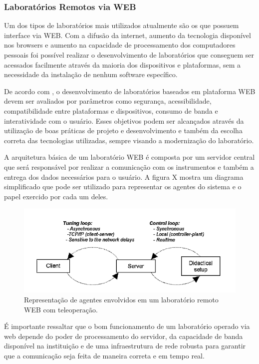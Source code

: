 \subsubsection{Laboratórios Remotos via WEB}
Um dos tipos de laboratórios mais utilizados atualmente são os que possuem interface via WEB. Com a difusão da internet, aumento da tecnologia disponível nos browsers e aumento na capacidade de processamento dos computadores pessoais foi possível realizar o desenvolvimento de laboratórios que conseguem ser acessados facilmente através da maioria dos dispositivos e plataformas, sem a necessidade da instalação de nenhum software específico. \cite{andria2006remote}
\par
De acordo com , o desenvolvimento de laboratórios baseados em plataforma WEB devem ser avaliados por parâmetros como segurança, acessibilidade, compatibilidade entre plataformas e dispositivos, consumo de banda e interatividade com o usuário. Esses objetivos podem ser alcançados através da utilização de boas práticas de projeto e desenvolvimento e também da escolha correta das tecnologias utilizadas, sempre visando a modernização do laboratório.
\par
A arquitetura básica de um laboratório WEB é composta por um servidor central que será responsável por realizar a comunicação com os instrumentos e também a entrega dos dados necessários para o usuário. A figura X mostra um diagrama simplificado que pode ser utilizado para representar os agentes do sistema e o papel exercido por cada um deles.
\begin{figure}[ht]
    \centering
    \includegraphics[width=.7\textwidth]{capitulos/servidorlaboratorio.png}
    \caption{Representação de agentes envolvidos em um laboratório remoto WEB com teleoperação. \cite{sanchez2004java}}
    \label{fig:servidorlaboratorio}
\end{figure}
\par
É importante ressaltar que o bom funcionamento de um laboratório operado via web depende do poder de processamento do servidor, da capacidade de banda disponível na instituição e de uma infraestrutura de rede robusta para garantir que a comunicação seja feita de maneira correta e em tempo real.